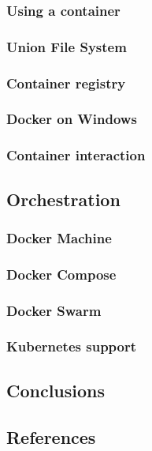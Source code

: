 \subsubsection{Using a container}
\subsubsection{Union File System}
\subsubsection{Container registry}
\subsubsection{Docker on Windows}
\subsubsection{Container interaction}
\subsection{Orchestration}
\subsubsection{Docker Machine}
\subsubsection{Docker Compose}
\subsubsection{Docker Swarm}
\subsubsection{Kubernetes support}
\subsection{Conclusions}
\subsection{References}
